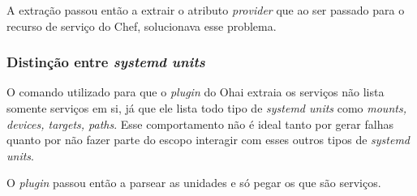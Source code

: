 A extração passou então a extrair o atributo \textit{provider} que ao ser passado
para o recurso de serviço do Chef, solucionava esse problema.

\subsubsection{Distinção entre \textit{systemd units}}
O comando utilizado para que o \textit{plugin} do Ohai extraia os serviços não
lista somente serviços em si, já que ele lista todo tipo de \textit{systemd units}
como \textit{mounts, devices, targets, paths}. Esse comportamento não é ideal
tanto por gerar falhas quanto por não fazer parte do escopo interagir com esses
outros tipos de \textit{systemd units}.

O \textit{plugin} passou então a parsear as unidades e só pegar os que são serviços.
